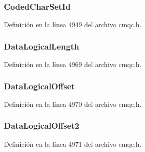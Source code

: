 \subsubsection[{Coded\+Char\+Set\+Id}]{ Coded\+Char\+Set\+Id}\label{structtag_m_q_r_m_h_a4d8d1961a991850d1355cdf9b4680b8e}


Definición en la línea 4949 del archivo cmqc.\+h.

\hypertarget{structtag_m_q_r_m_h_ab41c53790818701e5dfd105ba91b581e}{}
\subsubsection[{Data\+Logical\+Length}]{ Data\+Logical\+Length}\label{structtag_m_q_r_m_h_ab41c53790818701e5dfd105ba91b581e}


Definición en la línea 4969 del archivo cmqc.\+h.

\hypertarget{structtag_m_q_r_m_h_af68e2a3064ab13d5cfbe861444bf9615}{}
\subsubsection[{Data\+Logical\+Offset}]{ Data\+Logical\+Offset}\label{structtag_m_q_r_m_h_af68e2a3064ab13d5cfbe861444bf9615}


Definición en la línea 4970 del archivo cmqc.\+h.

\hypertarget{structtag_m_q_r_m_h_a99bf506b44a5386a018e2408a2a5f3f3}{}
\subsubsection[{Data\+Logical\+Offset2}]{ Data\+Logical\+Offset2}\label{structtag_m_q_r_m_h_a99bf506b44a5386a018e2408a2a5f3f3}


Definición en la línea 4971 del archivo cmqc.\+h.

